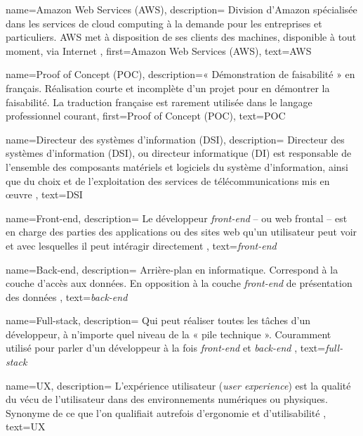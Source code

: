 {
    name={Amazon Web Services (\textsc{AWS})},
    description={
Division d'Amazon spécialisée dans les services de cloud computing à la demande pour les entreprises et particuliers. AWS met à disposition de ses clients des machines, disponible à tout moment, via Internet
    },
    first={Amazon Web Services (\textsc{AWS})},
    text={\textsc{AWS}}
}


{
    name={Proof of Concept (\textsc{POC})},
    description={« Démonstration de faisabilité » en français. Réalisation courte et incomplète d'un projet pour en démontrer la faisabilité. La traduction française est rarement utilisée dans le langage professionnel courant},
    first={Proof of Concept (\textsc{POC})},
    text={\textsc{POC}}
}

{
    name={Directeur des systèmes d'information (\textsc{DSI})},
    description={
Directeur des systèmes d'information (DSI), ou directeur informatique (DI) est responsable de l'ensemble des composants matériels et logiciels du système d'information, ainsi que du choix et de l'exploitation des services de télécommunications mis en œuvre
},
    text={\textsc{DSI}}
}

{
    name={Front-end},
	description={
Le développeur \textit{front-end} -- ou web frontal -- est en charge des parties des applications ou des sites web qu'un utilisateur peut voir et avec lesquelles il peut intéragir directement 
	},
	text={\textit{front-end}}
}

{
    name={Back-end},
	description={
\og Arrière-plan \fg en informatique. Correspond à la couche d'accès aux données. En opposition à la couche \textit{front-end} de \og présentation \fg des données
	},
	text={\textit{back-end}}
}

{
    name={Full-stack},
	description={
Qui peut réaliser toutes les tâches d’un développeur, à n’importe quel niveau de la « pile technique ». Couramment utilisé pour parler d'un développeur à la fois \textit{front-end} et \textit{back-end}
	},
	text={\textit{full-stack}}
}

{
    name={UX},
	description={
L'expérience utilisateur (\textit{user experience}) est la qualité du vécu de l'utilisateur dans des environnements numériques ou physiques. Synonyme de ce que l'on qualifiait autrefois d'ergonomie et d'utilisabilité
	},
	text={\textsc{UX}}
}


